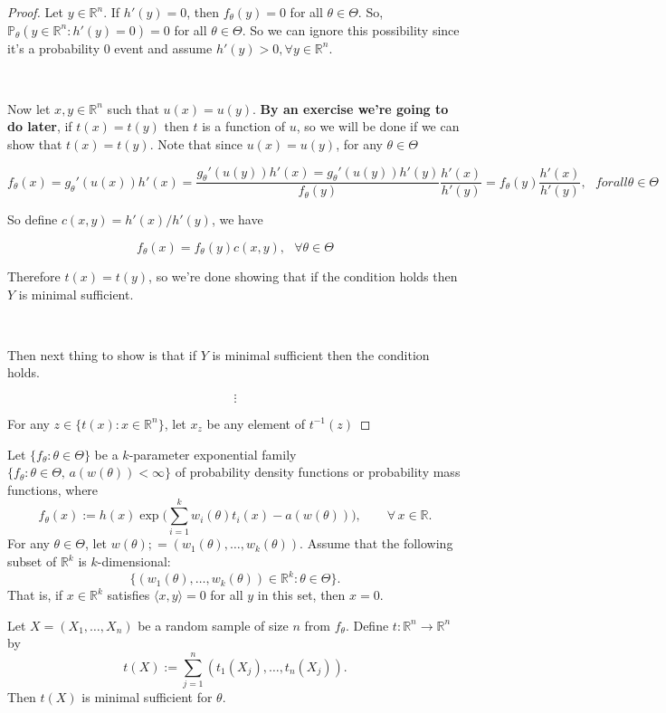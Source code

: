 \begin{proof}
Let \(y \in \mathbb{R}^n\). If \(h'(y) = 0\), then \(f_\theta(y) = 0\) for all \(\theta \in \Theta\). So, \(\mathbb{P}_\theta(y \in \mathbb{R}^n : h'(y) =0) = 0\) for all \(\theta \in \Theta\). So we can ignore this possibility since it's a probability 0 event and assume \(h'(y) > 0, \forall y \in \mathbb{R}^n\).

\

Now let \(x, y \in \mathbb{R}^n\) such that \(u(x) = u(y)\). \textbf{By an exercise we're going to do later}, if \(t(x) = t(y)\) then \(t\) is a function of \(u\), so we will be done if we can show that \(t(x) = t(y)\).  Note that  since \(u(x) = u(y)\), for any \(\theta \in \Theta \)

\[
f_\theta(x) = g_\theta'(u(x)) h'(x) = \frac{g_\theta'(u(y))h'(x) = g_\theta'(u(y)) h'(y) }{f_\theta(y)} \frac{h'(x)}{h'(y)} = f_\theta(y) \frac{h'(x)}{h'(y)}, \ \ \ forall \theta \in \Theta
\]

So define \(c(x,y) = h'(x)/h'(y)\), we have 

\[
f_\theta(x) = f_\theta(y) c(x,y), \ \ \ \forall \theta \in \Theta
\]

Therefore \(t(x) = t(y)\), so we're done showing that if the condition holds then \(Y\) is minimal sufficient. 

\

Then next thing to show is that if \(Y\) is minimal sufficient then the condition holds.

\[
\vdots
\]

For any \(z \in \{t(x): x \in \mathbb{R}^n\}\), let \(x_z\) be any element of \(t^{-1}(z)\)

\end{proof}

\begin{proposition} Let $\{f_{\theta}:\theta\in\Theta\}$ be a $k$-parameter exponential family $\{f_{\theta}:\theta\in \Theta,\,a(w(\theta))<\infty\}$ of probability density functions or probability mass functions, where
$$f_{\theta}(x):= h(x)\exp\Big(\sum_{i=1}^{k}w_{i}(\theta)t_{i}(x)-a(w(\theta))\Big),\qquad\forall\,x\in\mathbb{R}.$$ For any $\theta\in\Theta$, let $w(\theta);= (w_{1}(\theta),\ldots,w_{k}(\theta))$.  
Assume that the following subset of $\mathbb{R}^{k}$ is $k$-dimensional:
$$\{(w_{1}(\theta),\ldots,w_{k}(\theta))\in\mathbb{R}^{k}:\theta\in\Theta\}.$$
That is, if $x\in\mathbb{R}^{k}$ satisfies $\langle x,y\rangle=0$ for all $y$ in this set, then $x=0$.  

Let $X=(X_{1},\ldots,X_{n})$ be a random sample of size $n$ from $f_{\theta}$.  Define $t:\mathbb{R}^{n}\to\mathbb{R}^{n}$ by
$$t(X):=\sum_{j=1}^{n}\left(t_{1}(X_{j}),\ldots,t_{n}(X_{j})\right).$$
Then $t(X)$ is minimal sufficient for $\theta$.






\end{proposition}

